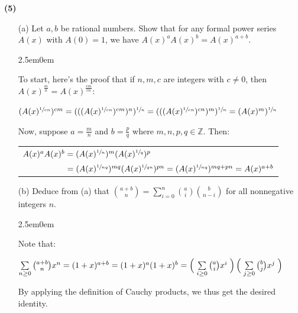 \documentclass{book}
\newcommand{\exOne}{%
   \color{Purple}%
   \fontsize{13}{15}\selectfont%
}
\newcommand{\exP}{%
   \color{Purple}%
   \fontsize{12}{14}\selectfont%
}
\newenvironment{myIndent}{%
   \begin{adjustwidth}{2.5em}{0em}%
}{%
   \end{adjustwidth}%
}
\newcommand{\blab}[1]{\textbf{#1}}
\newcommand{\retTwo}{\hfill\bigbreak}
\begin{document}
\blab{(5)}
\begin{enumerate}
   \item[(a)] Let $a, b$ be rational numbers. Show that for any formal power series $A(x)$ with $A(0) = 1$, we have $A(x)^aA(x)^b = A(x)^{a + b}$.
   
   \begin{myIndent}\exOne
      To start, here's the proof that if $n,m, c$ are integers with $c \neq 0$, then\\ $A(x)^{\frac{m}{n}} = A(x)^{\frac{cm}{cn}}$:

      {\centering\exP  $(A(x)^{\sfrac{1}{cn}})^{cm} = (((A(x)^{\sfrac{1}{cn}})^{cm})^n)^{\sfrac{1}{n}} = (((A(x)^{\sfrac{1}{cn}})^{cn})^m)^{\sfrac{1}{n}} = (A(x)^m)^{\sfrac{1}{n}}$\retTwo\par}

      Now, suppose $a = \frac{m}{n}$ and $b = \frac{p}{q}$ where $m,n,p,q \in \mathbb{Z}$. Then:

      {\centering\exP 
      \begin{tabular}{l}
         $A(x)^{a}A(x)^b = (A(x)^{\sfrac{1}{n}})^m(A(x)^{\sfrac{1}{q}})^p$\\
         $\phantom{A(x)^{a}A(x)^b} = (A(x)^{\sfrac{1}{nq}})^{mq}(A(x)^{\sfrac{1}{qn}})^{pn} = (A(x)^{\sfrac{1}{nq}})^{mq + pn} = A(x)^{a + b}$
      \end{tabular} \retTwo\par}
   \end{myIndent}

   \item[(b)] Deduce from (a) that $\binom{a+b}{n} = \sum\limits_{i=0}^n \binom{a}{i}\binom{b}{n-i}$ for all nonnegative integers $n$.
   
   \begin{myIndent}\exOne
      Note that:
      
      {\centering $\sum\limits_{n \geq 0}\binom{a + b}{n} x^n = (1 + x)^{a + b} = (1 + x)^a(1 + x)^b = \left(\vphantom{\int_|^|}\right.\sum\limits_{i \geq 0}\binom{a}{i} x^i\left.\vphantom{\int_|^|}\right)\left(\vphantom{\int_|^|}\right.\sum\limits_{j \geq 0}\binom{b}{j} x^j\left.\vphantom{\int_|^|}\right)$\retTwo\par}

      By applying the definition of Cauchy products, we thus get the desired identity.
   \end{myIndent}
\end{enumerate}
\end{document}
